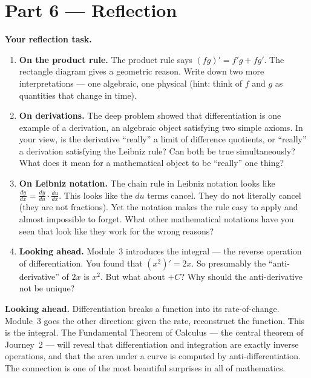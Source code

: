 \documentclass[12pt, a4paper]{article}
\newcounter{problem}
\begin{document}
\section{Part 6 \texorpdfstring{---}{--} Reflection}

\begin{reflectionbox}
\textbf{Your reflection task.}

\begin{enumerate}
  \item \textbf{On the product rule.} The product rule says $(fg)' = f'g + fg'$. The rectangle diagram gives a geometric reason. Write down two more interpretations --- one algebraic, one physical (hint: think of $f$ and $g$ as quantities that change in time).

  \item \textbf{On derivations.} The deep problem showed that differentiation is one example of a derivation, an algebraic object satisfying two simple axioms. In your view, is the derivative ``really'' a limit of difference quotients, or ``really'' a derivation satisfying the Leibniz rule? Can both be true simultaneously? What does it mean for a mathematical object to be ``really'' one thing?

  \item \textbf{On Leibniz notation.} The chain rule in Leibniz notation looks like $\frac{dy}{dx} = \frac{dy}{du} \cdot \frac{du}{dx}$. This looks like the $du$ terms cancel. They do not literally cancel (they are not fractions). Yet the notation makes the rule easy to apply and almost impossible to forget. What other mathematical notations have you seen that look like they work for the wrong reasons?

  \item \textbf{Looking ahead.} Module~3 introduces the integral --- the reverse operation of differentiation. You found that $(x^2)' = 2x$. So presumably the ``anti-derivative'' of $2x$ is $x^2$. But what about $+C$? Why should the anti-derivative not be unique?
\end{enumerate}
\end{reflectionbox}

\medskip
\noindent\textbf{Looking ahead.}
Differentiation breaks a function into its rate-of-change. Module~3 goes the other direction: given the rate, reconstruct the function. This is the integral. The Fundamental Theorem of Calculus --- the central theorem of Journey~2 --- will reveal that differentiation and integration are exactly inverse operations, and that the area under a curve is computed by anti-differentiation. The connection is one of the most beautiful surprises in all of mathematics.
\end{document}
